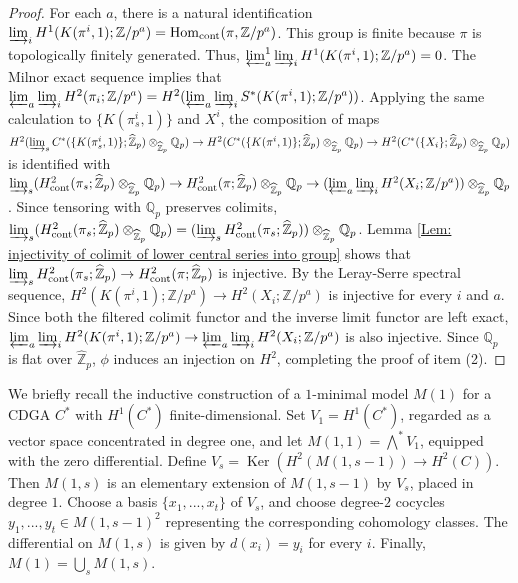 \documentclass[11pt]{amsart}
\theoremstyle{definition}
\numberwithin{equation}{section}
\numberwithin{equation}{section}
\newcommand\QQ{\mathbb{Q}}
\newcommand\ZZ{\mathbb{Z}}
\DeclareMathOperator{\homo}{Hom}
\DeclareMathOperator{\Ker}{Ker}
\DeclareMathOperator{\cont}{cont}
\begin{document}
\begin{proof}
For each $a$, there is a natural identification $\varinjlim_i H^1(K(\pi^i,1);\ZZ/p^a)=\homo_{\cont}(\pi,\ZZ/p^a)$. This group is finite because $\pi$ is topologically finitely generated. Thus, $\varprojlim^1_a\varinjlim_i H^1(K(\pi^i,1);\ZZ/p^a)=0$. The Milnor exact sequence implies that $\varprojlim_a \varinjlim_i H^2(\pi_i;\ZZ/p^a)=H^2(\varprojlim_a \varinjlim_i S^*(K(\pi^i,1);\ZZ/p^a))$. Applying the same calculation to $\{K(\pi^i_s,1)\}$ and $X^i$, the composition of maps $H^2(\varinjlim_sC^*(\{K(\pi^i_s,1)\};\widehat{\ZZ}_p)\otimes_{\widehat{\ZZ}_p} \QQ_p)\rightarrow H^2(C^*(\{K(\pi^i,1)\};\widehat{\ZZ}_p)\otimes_{\widehat{\ZZ}_p} \QQ_p)\rightarrow H^2(C^*(\{X_i\};\widehat{\ZZ}_p)\otimes_{\widehat{\ZZ}_p} \QQ_p)$ is identified with $\varinjlim_s (H^2_{\cont}(\pi_s;\widehat{\ZZ}_p)\otimes_{\widehat{\ZZ}_p}\QQ_p)\rightarrow H^2_{\cont}(\pi;\widehat{\ZZ}_p)\otimes_{\widehat{\ZZ}_p}\QQ_p\rightarrow (\varprojlim_a\varinjlim_i H^2(X_i;\ZZ/p^a))\otimes_{\widehat{\ZZ}_p}\QQ_p$. Since tensoring with $\QQ_p$ preserves colimits, $\varinjlim_s (H^2_{\cont}(\pi_s;\widehat{\ZZ}_p)\otimes_{\widehat{\ZZ}_p}\QQ_p)=(\varinjlim_sH^2_{\cont}(\pi_s;\widehat{\ZZ}_p))\otimes_{\widehat{\ZZ}_p}\QQ_p$. Lemma \ref{Lem: injectivity of colimit of lower central series into group} shows that $\varinjlim_sH^2_{\cont}(\pi_s;\widehat{\ZZ}_p)\rightarrow H^2_{\cont}(\pi;\widehat{\ZZ}_p)$ is injective. By the Leray-Serre spectral sequence, $H^2(K(\pi^i,1);\ZZ/p^a)\rightarrow H^2(X_i;\ZZ/p^a)$ is injective for every $i$ and $a$. Since both the filtered colimit functor and the inverse limit functor are left exact,  $\varprojlim_a\varinjlim_i H^2(K(\pi^i,1);\ZZ/p^a)\rightarrow \varprojlim_a\varinjlim_i H^2(X_i;\ZZ/p^a)$ is also injective. Since $\QQ_p$ is flat over $\widehat{\ZZ}_p$, $\phi$ induces an injection on $H^2$, completing the proof of item (2).
\end{proof}

We briefly recall the inductive construction of a $1$-minimal model $M(1)$ for a CDGA $C^*$ with $H^1(C^*)$ finite-dimensional. Set $V_1=H^1(C^*)$, regarded as a vector space concentrated in degree one, and let $M(1,1)=\bigwedge^* V_1$, equipped with the zero differential. Define $V_s=\Ker(H^2(M(1,s-1))\rightarrow H^2(C))$. Then $M(1,s)$ is an elementary extension of $M(1,s-1)$ by $V_s$, placed in degree $1$. Choose a basis $\{x_1,...,x_t\}$ of $V_s$, and choose degree-$2$ cocycles $y_1,...,y_t\in M(1,s-1)^2$ representing the corresponding cohomology classes. The differential on $M(1,s)$ is given by $d(x_i)=y_i$ for every $i$. Finally, $M(1)=\bigcup_s M(1,s)$.
\end{document}
